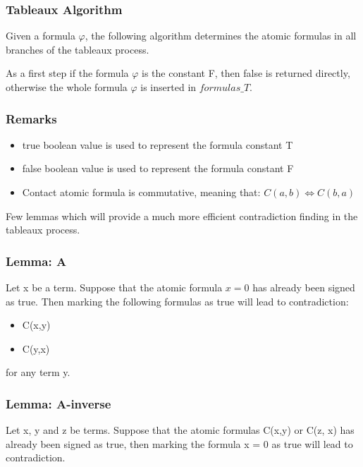 \documentclass{article}
\begin{document}
	\subsubsection*{Tableaux Algorithm}
	Given a formula $\varphi$, the following algorithm determines the atomic formulas in all branches of the tableaux process.

	As a first step if the formula $\varphi$ is the constant F, then false is returned directly, otherwise the whole formula $\varphi$ is inserted in $formulas\_T$.
	\newline
	\subsubsection*{Remarks}
	\begin{itemize}
		\item true boolean value is used to represent the formula constant T
		\item false boolean value is used to represent the formula constant F
		\item Contact atomic formula is commutative, meaning that: $C(a,b) \iff C(b,a)$
	\end{itemize}

	Few lemmas which will provide a much more efficient contradiction finding in the tableaux process.
	\subsubsection*{Lemma: A}
	Let x be a term. Suppose that the atomic formula $x = 0$ has already been signed as true.
	Then marking the following formulas as true will lead to contradiction:
	\begin{itemize}
		\item C(x,y)
		\item C(y,x)
	\end{itemize}
	for any term y.

	\subsubsection*{Lemma: A-inverse}
	Let x, y and z be terms. Suppose that the atomic formulas C(x,y) or C(z, x) has already been signed as true, then marking the formula x = 0 as true will lead to contradiction.
	\newline
\end{document}
